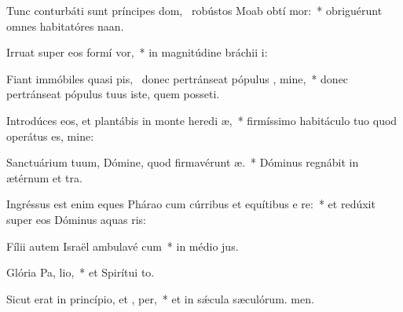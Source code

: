 \item Tunc conturbáti sunt príncipes dom,~\pscross{} robústos Moab obtí mor:~* obriguérunt omnes habitatóres naan.
\item Irruat super eos formí  vor,~* in magnitúdine bráchii i:
\item Fiant immóbiles quasi pis,~\pscross{} donec pertránseat pópulus , mine,~* donec pertránseat pópulus tuus iste, quem posseti.
\item Introdúces eos, et plantábis in monte heredi æ,~* firmíssimo habitáculo tuo quod operátus es, mine:
\item Sanctuárium tuum, Dómine, quod firmavérunt  æ.~* Dóminus regnábit in ætérnum et tra.
\item Ingréssus est enim eques Phárao cum cúrribus et equítibus e  re:~* et redúxit super eos Dóminus aquas ris:
\item Fílii autem Israël ambulavé  cum~* in médio jus.
\item Glória Pa,  lio,~* et Spirítui to.
\item Sicut erat in princípio, et ,  per,~* et in sǽcula sæculórum. men.
